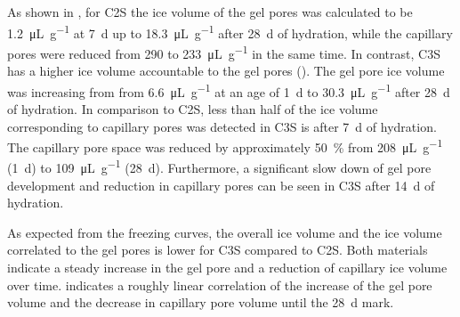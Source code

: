 As shown in , for \ac{C2S} the ice volume of the gel pores was calculated to be \qty{1.2}{\micro\liter\per\gram} at \qty{7}{\day} up to \qty{18.3}{\micro\liter\per\gram} after \qty{28}{\day} of hydration, while the capillary pores were reduced from \num{290} to \qty{233}{\micro\liter\per\gram} in the same time.
In contrast, \ac{C3S} has a higher ice volume accountable to the gel pores ().
The gel pore ice volume was increasing from from \qty{6.6}{\micro\liter\per\gram} at an age of \qty{1}{\day} to \qty{30.3}{\micro\liter\per\gram} after \qty{28}{\day} of hydration.
In comparison to \ac{C2S}, less than half of the ice volume corresponding to capillary pores was detected in \ac{C3S} is after \qty{7}{\day} of hydration.
The capillary pore space was reduced by approximately  \qty{50}{\percent} from \qty{208}{\micro\liter\per\gram} (\qty{1}{\day}) to \qty{109}{\micro\liter\per\gram} (\qty{28}{\day}).
Furthermore, a significant slow down of gel pore development and reduction in capillary pores can be seen in \ac{C3S} after \qty{14}{\day} of hydration.

As expected from the freezing curves, the overall ice volume and the ice volume correlated to the gel pores is lower for \ac{C3S} compared to \ac{C2S}.
Both materials indicate a steady increase in the gel pore and a reduction of capillary ice volume over time.
 indicates a roughly linear correlation of the increase of the gel pore volume and the decrease in capillary pore volume until the \qty{28}{\day} mark.

